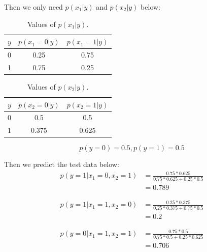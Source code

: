 \documentclass[12pt]{article}
\begin{document}
\begin{enumerate}
    Then we only need $p(x_1 | y)$ and $p(x_2 | y)$ below:

    \begin{table}[!hbp]
      \centering
      \begin{tabular}{|c||c|c|}
        \hline
        $y$ & $p(x_1=0 | y)$ & $p(x_1=1 | y)$  \\
        \hline
        0 & 0.25 & 0.75 \\
        \hline
        1 & 0.75 & 0.25 \\
        \hline
      \end{tabular}

      \caption{Values of $p(x_1 | y)$.}\label{table2}
    \end{table}

    \begin{table}[!hbp]
      \centering
      \begin{tabular}{|c||c|c|}
        \hline
        $y$ & $p(x_2=0 | y)$ & $p(x_2=1 | y)$  \\
        \hline
        0 & 0.5 & 0.5 \\
        \hline
        1 & 0.375 & 0.625 \\
        \hline
      \end{tabular}

      \caption{Values of $p(x_2 | y)$.}\label{table3}
    \end{table}

    \begin{equation}
    p(y = 0) = 0.5 , p(y = 1) = 0.5
    \end{equation}

    Then we predict the test data below:
    \begin{equation}
        \begin{split}
            p(y = 1|x_1 = 0, x_2 = 1) &= \frac{0.75*0.625}{0.75*0.625+0.25*0.5}\\
            &= 0.789
        \end{split}
    \end{equation}

    \begin{equation}
        \begin{split}
            p(y = 1|x_1 = 1, x_2 = 0) &= \frac{0.25*0.375}{0.25*0.375+0.75*0.5}\\
            &= 0.2
        \end{split}
    \end{equation}

    \begin{equation}
        \begin{split}
            p(y = 0|x_1 = 1, x_2 = 1) &=  \frac{0.75*0.5}{0.75*0.5+0.25*0.625}\\
            &= 0.706
        \end{split}
    \end{equation}


\end{enumerate}
\end{document}
